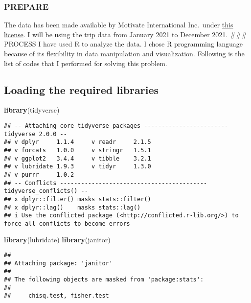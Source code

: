 \documentclass[
]{article}
\newenvironment{Shaded}{\begin{snugshade}}{\end{snugshade}}
\newcommand{\FunctionTok}[1]{\textcolor[rgb]{0.13,0.29,0.53}{\textbf{#1}}}
\newcommand{\NormalTok}[1]{#1}
\begin{document}
\hypertarget{prepare}{%
\subsubsection{PREPARE}\label{prepare}}

The data has been made available by Motivate International Inc.~under
\href{https://divvybikes.com/data-license-agreement}{this license}. I
will be using the trip data from January 2021 to December 2021. \#\#\#
PROCESS I have used R to analyze the data. I chose R programming
language because of its flexibility in data manipulation and
visualization. Following is the list of codes that I performed for
solving this problem.

\hypertarget{loading-the-required-libraries}{%
\subsection{Loading the required
libraries}\label{loading-the-required-libraries}}

\begin{Shaded}
\begin{Highlighting}[]
\FunctionTok{library}\NormalTok{(tidyverse)}
\end{Highlighting}
\end{Shaded}

\begin{verbatim}
## -- Attaching core tidyverse packages ------------------------ tidyverse 2.0.0 --
## v dplyr     1.1.4     v readr     2.1.5
## v forcats   1.0.0     v stringr   1.5.1
## v ggplot2   3.4.4     v tibble    3.2.1
## v lubridate 1.9.3     v tidyr     1.3.0
## v purrr     1.0.2     
## -- Conflicts ------------------------------------------ tidyverse_conflicts() --
## x dplyr::filter() masks stats::filter()
## x dplyr::lag()    masks stats::lag()
## i Use the conflicted package (<http://conflicted.r-lib.org/>) to force all conflicts to become errors
\end{verbatim}

\begin{Shaded}
\begin{Highlighting}[]
\FunctionTok{library}\NormalTok{(lubridate)}
\FunctionTok{library}\NormalTok{(janitor)}
\end{Highlighting}
\end{Shaded}

\begin{verbatim}
## 
## Attaching package: 'janitor'
## 
## The following objects are masked from 'package:stats':
## 
##     chisq.test, fisher.test
\end{verbatim}
\end{document}
